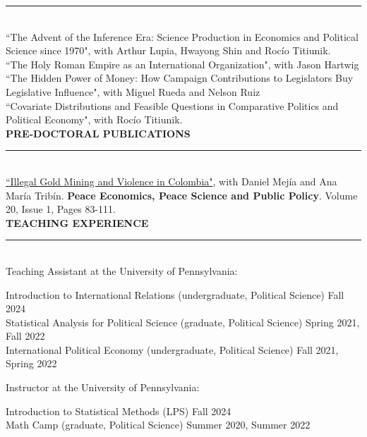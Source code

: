 \documentclass[10pt, english]{article}
\begin{document}
\noindent\rule{\textwidth}{1pt}\\

``The Advent of the Inference Era: Science Production in Economics and Political Science since 1970", with Arthur Lupia, Hwayong Shin and Roc\'io Titiunik.\\

``The Holy Roman Empire as an International Organization", with Jason Hartwig\\

``The Hidden Power of Money: How Campaign Contributions to Legislators Buy Legislative Influence", with Miguel Rueda and Nelson Ruiz\\

``Covariate Distributions and Feasible Questions in Comparative Politics and Political Economy", with Roc\'io Titiunik.\\

\vspace{0.2cm}
\textbf{PRE-DOCTORAL PUBLICATIONS}

\noindent\rule{\textwidth}{1pt}\\

\href{https://doi.org/10.1515/peps-2013-0053}{``Illegal Gold Mining and Violence in Colombia"}, with Daniel Mej\'ia and Ana Mar\'ia Trib\'in. \textbf{Peace Economics, Peace Science and Public Policy}. Volume 20, Issue 1, Pages 83-111.\\

\vspace{0.2cm}
\textbf{TEACHING EXPERIENCE}

\noindent\rule{\textwidth}{1pt}\\

Teaching Assistant at the University of Pennsylvania:
\vspace{-0.2cm}
\begin{flushright}
\begin{minipage}{0.95\textwidth}
Introduction to International Relations (undergraduate, Political Science) \hfill Fall 2024\\
Statistical Analysis for Political Science (graduate, Political Science) \hfill Spring 2021, Fall 2022\\
International Political Economy (undergraduate, Political Science) \hfill Fall 2021, Spring 2022\\
\end{minipage}
\end{flushright}

\vspace{-0.25cm}
Instructor at the University of Pennsylvania:
\vspace{-0.2cm}
\begin{flushright}
\begin{minipage}{0.95\textwidth}
Introduction to Statistical Methods (LPS) \hfill Fall 2024\\	
Math Camp (graduate, Political Science) \hfill Summer 2020, Summer 2022\\
\end{minipage}
\end{flushright}
\end{document}
